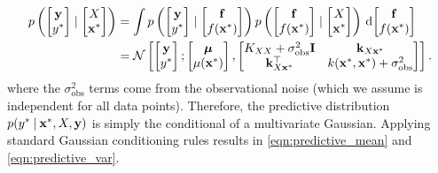 \begin{align*}
  p \left(
    \begin{bmatrix} \by \\ \ytest \end{bmatrix} \mid
    \begin{bmatrix} \bX \\ \bxtest \end{bmatrix}
  \right)
  &= \int
    p \left(
      \begin{bmatrix} \by \\ \ytest \end{bmatrix} \mid
      \begin{bmatrix} \bfn \\ f(\bxtest) \end{bmatrix}
    \right)
    p \left(
      \begin{bmatrix} \bfn \\ f(\bxtest) \end{bmatrix} \mid
      \begin{bmatrix} \bX \\ \bxtest \end{bmatrix}
    \right)
    \intd { \begin{bmatrix} \bfn \\ f(\bxtest) \end{bmatrix} }
  \\
  \vspace{0.5em}
  &= \normaldist{
    \begin{bmatrix} \by \\ \ytest \end{bmatrix} ;
    \begin{bmatrix} \bmu \\ \mu(\bxtest) \end{bmatrix}
  }{
    \begin{bmatrix}
      \bK_{\bX \bX} + \sigma_\text{obs}^2 \mathbf I   & \bk_{\bX \bxtest} \\
      \bk_{\bX \bxtest}^\top         & k(\bxtest, \bxtest) + \sigma_\text{obs}^2
    \end{bmatrix}
  }.
\end{align*}
where the $\sigma_\text{obs}^2$ terms come from the observational noise (which we assume is independent for all data points).
%
Therefore, the predictive distribution $p(y^* \: \vert \: \mathbf{x}^*, X, \mathbf{y})$ is simply the conditional of a multivariate Gaussian.
Applying standard Gaussian conditioning rules \citep[see e.g.][]{bishop2006pattern,rasmussen2006gaussian} results in \autoref{eqn:predictive_mean} and \autoref{eqn:predictive_var}.

